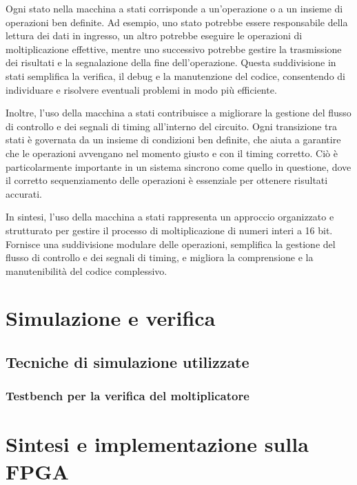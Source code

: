 \documentclass[titlepage]{report}
\begin{document}
			Ogni stato nella macchina a stati corrisponde a un'operazione o a un insieme di operazioni ben definite. Ad esempio, uno stato potrebbe essere responsabile della lettura dei dati in ingresso, un altro potrebbe eseguire le operazioni di moltiplicazione effettive, mentre uno successivo potrebbe gestire la trasmissione dei risultati e la segnalazione della fine dell'operazione. Questa suddivisione in stati semplifica la verifica, il debug e la manutenzione del codice, consentendo di individuare e risolvere eventuali problemi in modo più efficiente.

			Inoltre, l'uso della macchina a stati contribuisce a migliorare la gestione del flusso di controllo e dei segnali di timing all'interno del circuito. Ogni transizione tra stati è governata da un insieme di condizioni ben definite, che aiuta a garantire che le operazioni avvengano nel momento giusto e con il timing corretto. Ciò è particolarmente importante in un sistema sincrono come quello in questione, dove il corretto sequenziamento delle operazioni è essenziale per ottenere risultati accurati.

			In sintesi, l'uso della macchina a stati rappresenta un approccio organizzato e strutturato per gestire il processo di moltiplicazione di numeri interi a 16 bit. Fornisce una suddivisione modulare delle operazioni, semplifica la gestione del flusso di controllo e dei segnali di timing, e migliora la comprensione e la manutenibilità del codice complessivo.


\chapter{Simulazione e verifica}
\label{ch:simulazione_verifica}

	\section{Tecniche di simulazione utilizzate}
	\label{sec:tecniche_simulazione}
		\subsection{Testbench per la verifica del moltiplicatore}
		\label{subsec:testbench_verifica}

\chapter{Sintesi e implementazione sulla FPGA}
\label{ch:sintesi_implementazione}
\end{document}
